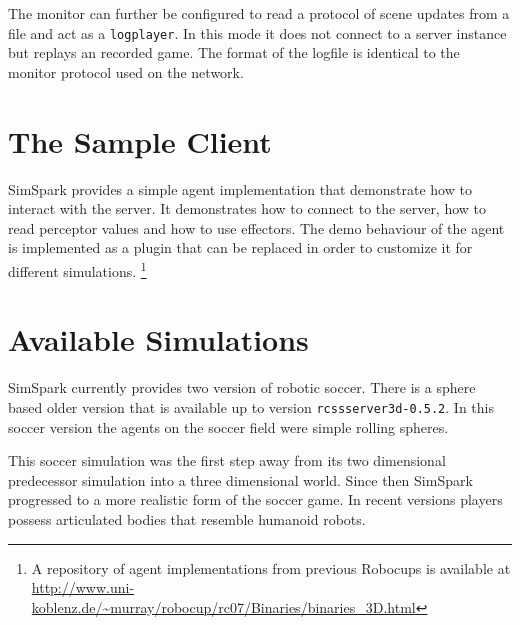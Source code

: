 The monitor can further be configured to read a protocol of scene
updates from a file and act as a \texttt{logplayer}. In this mode it
does not connect to a server instance but replays an recorded
game. The format of the logfile is identical to the monitor protocol
used on the network.

\section{The Sample Client}

SimSpark provides a simple agent implementation that demonstrate how
to interact with the server. It demonstrates how to connect to the
server, how to read perceptor values and how to use effectors. The
demo behaviour of the agent is implemented as a plugin that can be
replaced in order to customize it for different
simulations. \footnote{A repository of agent implementations from
previous Robocups is available at
\url{http://www.uni-koblenz.de/~murray/robocup/rc07/Binaries/binaries_3D.html}}

\section{Available Simulations}

SimSpark currently provides two version of robotic soccer. There is a
sphere based older version that is available up to version
\texttt{rcssserver3d-0.5.2}. In this soccer version the agents on the
soccer field were simple rolling spheres. 

This soccer simulation was the first step away from its two
dimensional predecessor simulation into a three dimensional
world. Since then SimSpark progressed to a more realistic form of the
soccer game. In recent versions players possess articulated bodies
that resemble humanoid robots.



